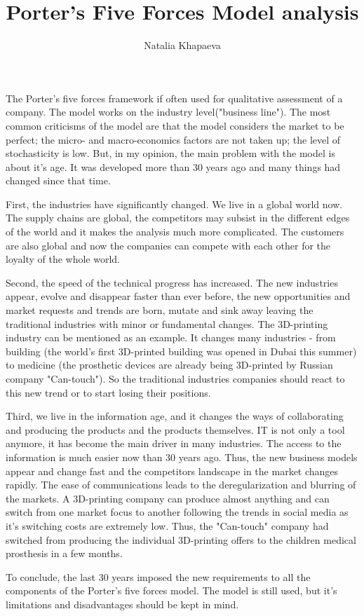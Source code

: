 \documentclass[7pt]{article}
\title{Porter's Five Forces Model analysis}
\author{Natalia Khapaeva}
\begin{document}
\maketitle
\footnotesize


The Porter's five forces framework if often used for qualitative assessment of a company.
The model works on the industry level("business line"\citep{article1}).
The most common criticisms of the model are that the model considers the market to be perfect; the micro- and macro-economics factors are not taken up; the level of stochasticity is low.
But, in my opinion, the main problem with the model is about it's age. It was developed more than 30 years ago and many things had changed since that time.


First, the industries have significantly changed. We live in a global world now. The supply chains are global, the competitors may subsist in the different edges of the world and it makes the analysis much more complicated. The customers are also global and now the companies can compete with each other for the loyalty of the whole world.

Second, the speed of the technical progress has increased. The new industries appear, evolve and disappear faster than ever before, the new opportunities and market requests and trends are born, mutate and sink away leaving the traditional industries with minor or fundamental changes.
The 3D-printing industry can be mentioned as an example. It changes many industries - from building (the world's first 3D-printed building was opened in Dubai this summer) to medicine (the prosthetic devices are already being 3D-printed by Russian company "Can-touch"). So the traditional industries companies should react to this new trend or to start losing their positions.

Third, we live in the information age, and it changes the ways of collaborating and producing the products and the products themselves. IT is not only a tool anymore, it has become the main driver in many industries\citep{article1}.
The access to the information is much easier now than 30 years ago. Thus, the new business models appear and change fast and the competitors landscape in the market changes rapidly.
The ease of communications leads to the deregularization and blurring of the markets. A 3D-printing company can produce almost anything and can switch from one market focus to another following the trends in social media as it's switching costs are extremely low. Thus, the "Can-touch" company had switched from producing the individual 3D-printing offers to the children medical prosthesis in a few months.


To conclude, the last 30 years imposed the new requirements to all the components of the Porter's five forces model. The model is still used, but it's limitations and disadvantages should be kept in mind.

\scriptsize
\nocite{*}


\end{document}
